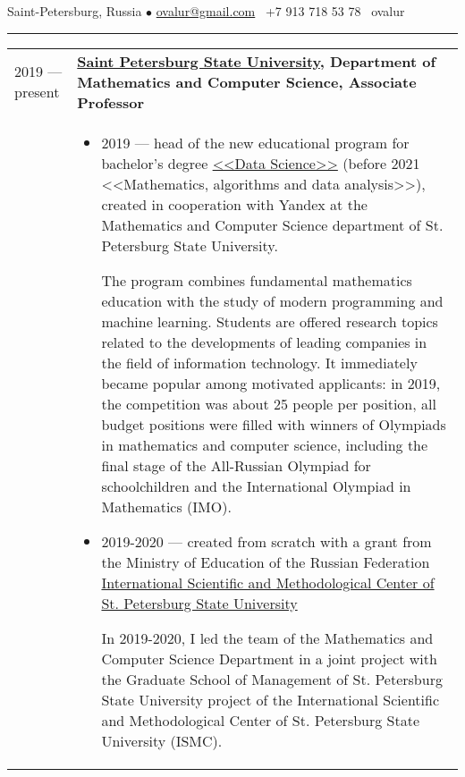 \documentclass[11pt]{article}
\newif\ifdetailed
\begin{document}
%

\vspace{0.5em}

\noindent Saint-Petersburg, Russia $\bullet$ \href{mailto:ovalur@gmail.com}{ovalur@gmail.com} \faMobile~+7 913 718 53 78 \faSendO~ovalur

\vspace{0.5em}
\hrule
\vspace{1.0em}

\begin{longtable} {l | p{}}

2019 — present & {\textbf{\href{https://spbu.ru}{Saint Petersburg State University}, Department of Mathematics and Computer Science, Associate Professor}} \\
\ifdetailed
& \vspace{-1em}
\begin{itemize}
	\item 2019 — head of the new educational program for bachelor's degree \href{https://maad.compscicenter.ru}{<<Data Science>>} (before 2021 <<Mathematics, algorithms and data analysis>>), created in cooperation with Yandex at the Mathematics and Computer Science department of St. Petersburg State University.

    The program combines fundamental mathematics education with the study of modern programming and machine learning. Students are offered research topics related to the developments of leading companies in the field of information technology. It immediately became popular among motivated applicants: in 2019, the competition was about 25 people per position, all budget positions were filled with winners of Olympiads in mathematics and computer science, including the final stage of the All-Russian Olympiad for schoolchildren and the International Olympiad in Mathematics (IMO).

    \item 2019-2020 — created from scratch with a grant from the Ministry of Education of the Russian Federation \href{https://gsom.spbu.ru/all_news/event2021-02-04/}{International Scientific and Methodological Center of St. Petersburg State University}

    In 2019-2020, I led the team of the Mathematics and Computer Science Department in a joint project with the Graduate School of Management of St. Petersburg State University project of the International Scientific and Methodological Center of St. Petersburg State University (ISMC).


\end{itemize}
\end{longtable}
\end{document}
